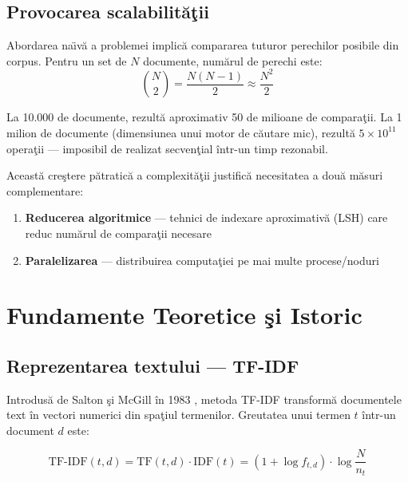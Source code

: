 \documentclass[a4paper,12pt]{report}
\begin{document}
\section{Provocarea scalabilit\u{a}\c{t}ii}

Abordarea na\"{\i}v\u{a} a problemei implic\u{a} compararea tuturor perechilor posibile din corpus. Pentru un set de $N$ documente, num\u{a}rul de perechi este:
\begin{equation}
  \binom{N}{2} = \frac{N(N-1)}{2} \approx \frac{N^2}{2}
\label{eq:naive}
\end{equation}

La 10.000 de documente, rezult\u{a} aproximativ 50 de milioane de compara\c{t}ii. La 1 milion de documente (dimensiunea unui motor de c\u{a}utare mic), rezult\u{a} $5 \times 10^{11}$ opera\c{t}ii — imposibil de realizat secven\c{t}ial \^{i}ntr-un timp rezonabil.

Aceast\u{a} cre\c{s}tere p\u{a}tratic\u{a} a complexit\u{a}\c{t}ii justific\u{a} necesitatea a dou\u{a} m\u{a}suri complementare:
\begin{enumerate}
  \item \textbf{Reducerea algoritmice} — tehnici de indexare aproximativ\u{a} (LSH) care reduc num\u{a}rul de compara\c{t}ii necesare
  \item \textbf{Paralelizarea} — distribuirea computa\c{t}iei pe mai multe procese/noduri
\end{enumerate}

\chapter{Fundamente Teoretice \c{s}i Istoric}

\section{Reprezentarea textului — \ac{TF-IDF}}

Introdus\u{a} de Salton \c{s}i McGill \^{i}n 1983 \cite{salton1983}, metoda \ac{TF-IDF} transform\u{a} documentele text \^{i}n vectori numerici din spa\c{t}iul termenilor. Greutatea unui termen $t$ \^{i}ntr-un document $d$ este:

\begin{equation}
  \text{TF-IDF}(t,d) = \text{TF}(t,d) \cdot \text{IDF}(t)
  = \left(1 + \log f_{t,d}\right) \cdot \log\!\frac{N}{n_t}
\label{eq:tfidf}
\end{equation}
\end{document}
